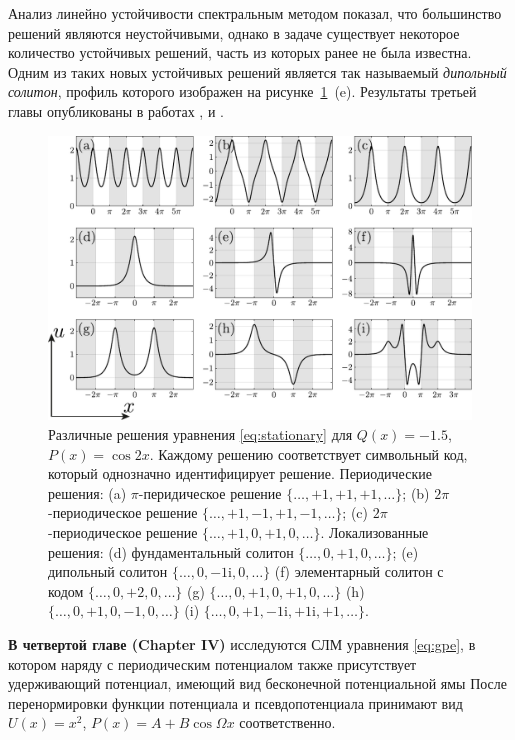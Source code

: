 \documentclass[candidate, href, colorlinks]{disser}
\begin{document}
Анализ линейно устойчивости спектральным методом показал, что большинство решений являются неустойчивыми, однако в задаче существует некоторое количество устойчивых решений, часть из которых ранее не была известна.
Одним из таких новых устойчивых решений является так называемый {\it дипольный солитон}, профиль которого изображен на рисунке~\ref{fig:solutions}~(e).
Результаты третьей главы опубликованы в работах \cite{LebedevAlfimovMalomed}, \cite{NizhniNovgorod2016} и \cite{Tashkent2018}.

\begin{figure}[h!]
\centering
	\includegraphics[scale = 1]{../pic/solutions for cosine equation}
	\caption{
		Различные решения уравнения \eqref{eq:stationary} для $Q(x) = -1.5$, $P(x) = \cos 2x$.
		Каждому решению соответствует символьный код, который однозначно идентифицирует решение.
		Периодические решения: (a) $\pi$-перидическое решение $\{ \dots, +1, +1, +1, \dots \}$; (b) $2 \pi$-периодическое решение $\{ \dots, +1, -1, +1, -1, \dots \}$; (c) $2 \pi$-периодическое решение $\{ \dots, +1, 0, +1, 0, \dots \}$.
		Локализованные решения: (d) фундаментальный солитон $\{ \dots, 0, +1, 0, \dots \}$; (e) дипольный солитон $\{ \dots, 0, -1\mathrm{i}, 0, \dots \}$ (f) элементарный солитон с кодом $\{ \dots, 0, +2, 0, \dots \}$ (g) $\{ \dots, 0, +1, 0, +1, 0, \dots \}$ (h) $\{ \dots, 0, +1, 0, -1, 0, \dots \}$ (i) $\{ \dots, 0, +1, -1\mathrm{i}, +1\mathrm{i}, +1, \dots \}$.
	}
\label{fig:solutions}
\end{figure}

\textbf{В четвертой главе (Chapter IV)} исследуются СЛМ уравнения \eqref{eq:gpe}, в котором наряду с периодическим потенциалом также присутствует удерживающий потенциал, имеющий вид бесконечной потенциальной ямы
После перенормировки функции потенциала и псевдопотенциала принимают вид $U(x) = x^2$, $P(x) = A + B \cos \Omega x$ соответственно.
\end{document}
